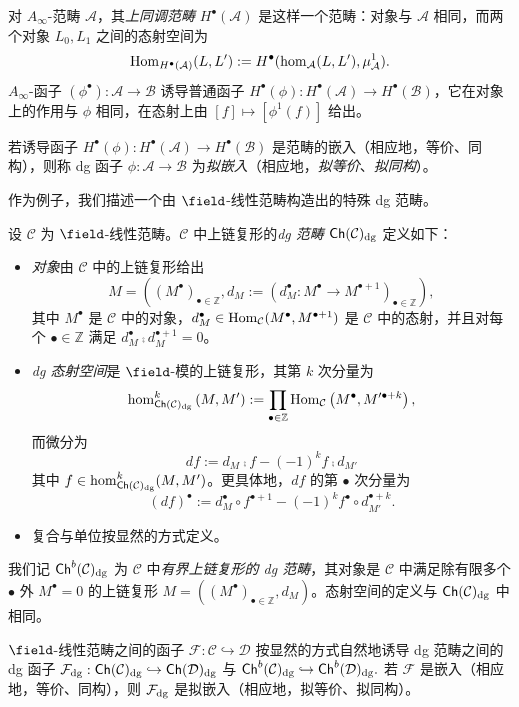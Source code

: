 \begin{dfn}
对 $A_{\infty}$-范畴 $\mathcal{A}$，其\emph{上同调范畴} $H^{\bullet}(\mathcal{A})$ 是这样一个范畴：对象与 $\mathcal{A}$ 相同，而两个对象 $L_0, L_1$ 之间的态射空间为
$$
\operatorname{\operatorname{Hom}}_{H^{\bullet}(\mathcal{A})}(L,L')
:=
H^{\bullet}(\hom_{\mathcal{A}}(L,L'),\mu_{\mathcal{A}}^1).
$$
$A_{\infty}$-函子 $(\phi^{\bullet}):\mathcal{A}\rightarrow\mathcal{B}$ 诱导普通函子 $H^{\bullet}(\phi):H^{\bullet}(\mathcal{A})\rightarrow H^{\bullet}(\mathcal{B})$，它在对象上的作用与 $\phi$ 相同，在态射上由 $[f]\mapsto [\phi^1(f)]$ 给出。

若诱导函子 $H^{\bullet}(\phi):H^{\bullet}(\mathcal{A})\rightarrow H^{\bullet}(\mathcal{B})$ 是范畴的嵌入（相应地，等价、同构），则称 dg 函子 $\phi:\mathcal{A}\rightarrow\mathcal{B}$ 为\emph{拟嵌入}（相应地，\emph{拟等价}、\emph{拟同构}）。
\end{dfn}
作为例子，我们描述一个由 $\field$-线性范畴构造出的特殊 dg 范畴。
\begin{dfn}
设 $\mathcal{C}$ 为 $\field$-线性范畴。$\mathcal{C}$ 中上链复形的\emph{dg 范畴 $\operatorname{\mathsf{Ch}}(\mathcal{C})_{\operatorname{\operatorname{dg}}}$} 定义如下：
\begin{itemize}
\item
\emph{对象}由 $\mathcal{C}$ 中的上链复形给出
$$
M
=
\left(\left(M^{\bullet}\right)_{\bullet\in\mathbb{Z}},
d_M:=\left(d_M^\bullet:M^{\bullet}\rightarrow M^{\bullet+1}\right)_{\bullet\in\mathbb{Z}}\right),
$$
其中 $M^{\bullet}$ 是 $\mathcal{C}$ 中的对象，$d_M^{\bullet}\in\operatorname{\operatorname{Hom}}_{\mathcal{C}}(M^{\bullet},M^{\bullet+1})$ 是 $\mathcal{C}$ 中的态射，并且对每个 $\bullet\in\mathbb{Z}$ 满足 $d_M^{\bullet}\comp d_M^{\bullet+1}=0$。

\item
\emph{dg 态射空间}是 $\field$-模的上链复形，其第 $k$ 次分量为
$$
\hom_{\operatorname{\mathsf{Ch}}(\mathcal{C})_{\operatorname{\operatorname{dg}}}}^k
\left(
M,M'
\right)
:=
\prod_{\bullet\in\mathbb{Z}}
\operatorname{\operatorname{Hom}}_{\mathcal{C}}\left(M^{\bullet},M'^{\bullet+k}\right),
$$
而微分为
$$
df:=d_M\comp f - (-1)^k f\comp d_{M'}
$$
其中 $f\in \hom_{\operatorname{\mathsf{Ch}}(\mathcal{C})_{\operatorname{\operatorname{dg}}}}^k(M,M')$。更具体地，$df$ 的第 $\bullet$ 次分量为
$$
(df)^{\bullet}
:=
d_M^{\bullet}\circ f^{\bullet+1}
-
(-1)^k
f^{\bullet}\circ d_{M'}^{\bullet+k}.
$$
\item
复合与单位按显然的方式定义。
\end{itemize}
我们记 $\operatorname{\mathsf{Ch}}^b(\mathcal{C})_{\operatorname{\operatorname{dg}}}$ 为 $\mathcal{C}$ 中\emph{有界上链复形的 dg 范畴}，其对象是 $\mathcal{C}$ 中满足除有限多个 $\bullet$ 外 $M^{\bullet}=0$ 的上链复形 $M=\left(\left(M^{\bullet}\right)_{\bullet\in\mathbb{Z}},d_M\right)$。态射空间的定义与 $\operatorname{\mathsf{Ch}}(\mathcal{C})_{\operatorname{\operatorname{dg}}}$ 中相同。
\end{dfn}
\begin{rmk}\label{rmk:EmbeddingOfCochainComplexes}
$\field$-线性范畴之间的函子 $\mathcal{F}:\mathcal{C}\hookrightarrow\mathcal{D}$ 按显然的方式自然地诱导 dg 范畴之间的 dg 函子
$
\mathcal{F}_{\operatorname{\operatorname{dg}}}:
\operatorname{\mathsf{Ch}}(\mathcal{C})_{\operatorname{\operatorname{dg}}}
\hookrightarrow
\operatorname{\mathsf{Ch}}(\mathcal{D})_{\operatorname{\operatorname{dg}}}
$
与
$
\operatorname{\mathsf{Ch}}^b(\mathcal{C})_{\operatorname{\operatorname{dg}}}
\hookrightarrow
\operatorname{\mathsf{Ch}}^b(\mathcal{D})_{\operatorname{\operatorname{dg}}}.
$
若 $\mathcal{F}$ 是嵌入（相应地，等价、同构），则 $\mathcal{F}_{\operatorname{\operatorname{dg}}}$ 是拟嵌入（相应地，拟等价、拟同构）。
\end{rmk}
